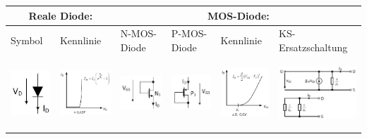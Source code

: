 \begin{tabular}{|p{}|p{}|p{}|p{}|p{}|p{}|}
	\hline
	\multicolumn{2}{|c|}{\textbf{Reale Diode:}}&\multicolumn{4}{c|}{\textbf{MOS-Diode:}}\\ \hline
	Symbol&Kennlinie&N-MOS-Diode&P-MOS-Diode&Kennlinie&KS-Ersatzschaltung\\
	\includegraphics[height=2.6cm]{chapters/Diode/images/realeDiode}&
	\includegraphics[height=2.6cm]{chapters/Diode/images/KennlinieRealeDiode}&
	\includegraphics[height=2.6cm]{chapters/Diode/images/NMOS-Diode}&
	\includegraphics[height=2.6cm]{chapters/Diode/images/PMOS-Diode}&
	\includegraphics[height=2.6cm]{chapters/Diode/images/KennlinieDiode}&
	\includegraphics[height=2.6cm]{chapters/Diode/images/KS_Diode}\\ \hline
\end{tabular}\\[1ex]

